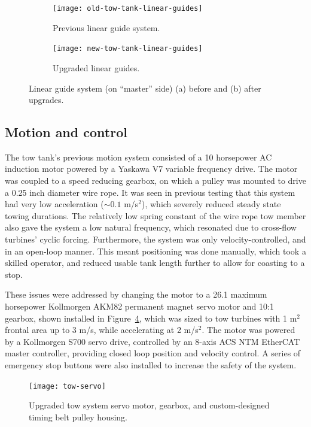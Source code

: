 \begin{figure}
    \centering

    \begin{subfigure}{0.47\textwidth}
        \texttt{[image: old-tow-tank-linear-guides]}
        \caption{Previous linear guide system.}
        \label{fig:old-linear-guides}
    \end{subfigure}
    \begin{subfigure}{0.47\textwidth}
        \texttt{[image: new-tow-tank-linear-guides]}
        \caption{Upgraded linear guides.}
        \label{fig:new-linear-guides}
    \end{subfigure}

    \caption{Linear guide system (on ``master'' side) (a) before and (b) after
        upgrades.}
\end{figure}


\subsection{Motion and control}

The tow tank's previous motion system consisted of a 10 horsepower AC induction
motor powered by a Yaskawa V7 variable frequency drive. The motor was coupled to
a speed reducing gearbox, on which a pulley was mounted to drive a 0.25 inch
diameter wire rope. It was seen in previous testing that this system had very
low acceleration ($\sim 0.1$ m/s$^2$), which severely reduced steady state
towing durations. The relatively low spring constant of the wire rope tow member
also gave the system a low natural frequency, which resonated due to cross-flow
turbines' cyclic forcing. Furthermore, the system was only velocity-controlled,
and in an open-loop manner. This meant positioning was done manually, which took
a skilled operator, and reduced usable tank length further to allow for coasting
to a stop.

These issues were addressed by changing the motor to a 26.1 maximum horsepower
Kollmorgen AKM82 permanent magnet servo motor and 10:1 gearbox, shown installed
in Figure~\ref{fig:tow-servo}, which was sized to tow turbines with 1 m$^2$
frontal area up to 3 m/s, while accelerating at 2 m/s$^2$. The motor was powered
by a Kollmorgen S700 servo drive, controlled by an 8-axis ACS NTM EtherCAT
master controller, providing closed loop position and velocity control. A series
of emergency stop buttons were also installed to increase the safety of the
system.

\begin{figure}
    \centering

    \texttt{[image: tow-servo]}

    \caption{Upgraded tow system servo motor, gearbox, and custom-designed
        timing belt pulley housing.}

    \label{fig:tow-servo}
\end{figure}

